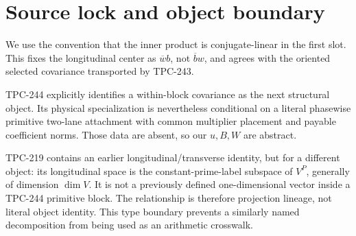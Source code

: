 \section{Source lock and object boundary}

We use the convention that the inner product is conjugate-linear in the first
slot.  This fixes the longitudinal center as $\overline w b$, not
$\overline b w$, and agrees with the oriented selected covariance transported
by TPC-243.

TPC-244 explicitly identifies a within-block covariance as the next structural
object.  Its physical specialization is nevertheless conditional on a literal
phasewise primitive two-lane attachment with common multiplier placement and
payable coefficient norms.  Those data are absent, so our $u,B,W$ are abstract.

TPC-219 contains an earlier longitudinal/transverse identity, but for a
different object: its longitudinal space is the constant-prime-label subspace
of $V^P$, generally of dimension $\dim V$.  It is not a previously defined
one-dimensional vector inside a TPC-244 primitive block.  The relationship is
therefore projection lineage, not literal object identity.  This type boundary
prevents a similarly named decomposition from being used as an arithmetic
crosswalk.
